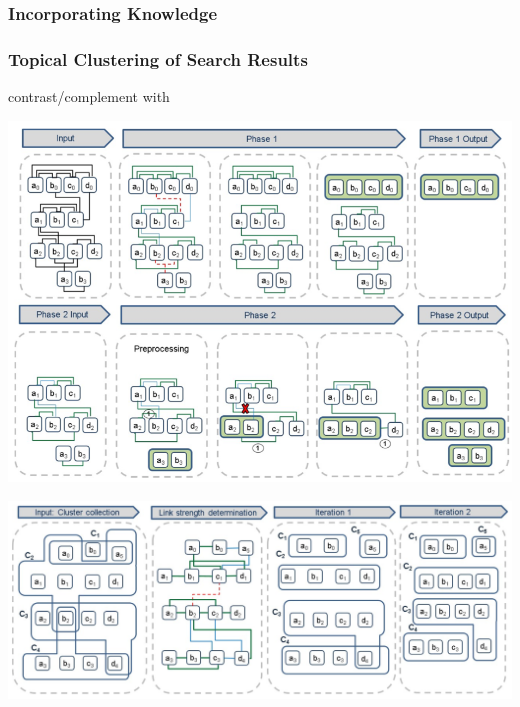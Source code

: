 \documentclass[runningheads]{llncs}
\begin{document}
\subsubsection{Incorporating Knowledge }


\subsubsection{Topical Clustering of Search Results}
\cite{Scaiella} contrast/complement with \cite{Schuhmacher}


\begin{center}
\includegraphics[width=1\textwidth]{clip_example.png}
\end{center}

\begin{center}
\includegraphics[width=1\textwidth]{clip_overlap_resolution.png}
\end{center}
\end{document}
